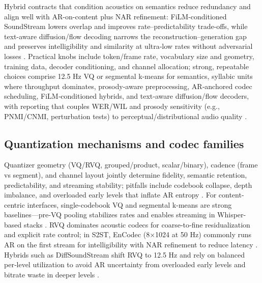 \documentclass{article}
\begin{document}
Hybrid contracts that condition acoustics on semantics reduce redundancy and align well with AR-on-content plus NAR refinement: FiLM-conditioned SoundStream lowers overlap and improves rate–predictability trade-offs, while text-aware diffusion/flow decoding narrows the reconstruction–generation gap and preserves intelligibility and similarity at ultra‑low rates without adversarial losses \cite{yang2025diffsoundstreamefficientspeechtokenizati,peng2024mslms2stmultitaskspeechlanguagemodeltext,wang2025tadicodectextawarediffusionspeechtokeniz}. Practical knobs include token/frame rate, vocabulary size and geometry, training data, decoder conditioning, and channel allocation; strong, repeatable choices comprise 12.5 Hz VQ or segmental k-means for semantics, syllabic units where throughput dominates, prosody-aware preprocessing, AR‑anchored codec scheduling, FiLM‑conditioned hybrids, and text‑aware diffusion/flow decoders, with reporting that couples WER/WIL and prosody sensitivity (e.g., PNMI/CNMI, perturbation tests) to perceptual/distributional audio quality \cite{zeng2024scalingspeechtextpretrainingsyntheticint,kando2025exploringeffectsegmentationvocabularysiz,baade2024syllablelmlearningcoarsesemanticunitsspe,onda2025benchmarkingprosodyencodingdiscretespeec,li2024investigatingneuralaudiocodecsspeechlang,yang2025diffsoundstreamefficientspeechtokenizati,wang2025tadicodectextawarediffusionspeechtokeniz,guo2025recentadvancesdiscretespeechtokensreview}.

\subsection{Quantization mechanisms and codec families} \label{subsec:Quantization mechanisms and codec families}
Quantizer geometry (VQ/RVQ, grouped/product, scalar/binary), cadence (frame vs segment), and channel layout jointly determine fidelity, semantic retention, predictability, and streaming stability; pitfalls include codebook collapse, depth imbalance, and overloaded early levels that inflate AR entropy \cite{zeng2024scalingspeechtextpretrainingsyntheticint}. For content-centric interfaces, single-codebook VQ and segmental k-means are strong baselines—pre‑VQ pooling stabilizes rates and enables streaming in Whisper-based stacks \cite{baade2024syllablelmlearningcoarsesemanticunitsspe,zeng2024scalingspeechtextpretrainingsyntheticint}. RVQ dominates acoustic codecs for coarse‑to‑fine residualization and explicit rate control; in S2ST, EnCodec (8×1024 at 50 Hz) commonly runs AR on the first stream for intelligibility with NAR refinement to reduce latency \cite{peng2024mslms2stmultitaskspeechlanguagemodeltext}. Hybrids such as DiffSoundStream shift RVQ to 12.5 Hz and rely on balanced per‑level utilization to avoid AR uncertainty from overloaded early levels and bitrate waste in deeper levels \cite{yang2025diffsoundstreamefficientspeechtokenizati}.
\end{document}
